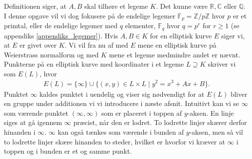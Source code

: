Definitionen siger, at $A, B$ skal tilhøre et legeme $K$. Det kunne være $\mathbb{R}, \mathbb{C}$ eller $\mathbb{Q}$. I denne opgave vil vi dog fokusere på de endelige legemer $\mathbb{F}_p = \mathbb{Z}/p\mathbb{Z}$ hvor $p$ er et primtal, eller de endelige legemer med $q$ elementer, $\mathbb{F}_q$ hvor $q = p^r$ for $r \geq 1$ (se appendiks \ref{appendiks_legemer}). Hvis $A, B \in K$ for en elliptisk kurve $E$ siger vi, at $E$ er givet over $K$. Vi vil fra nu af med $E$ mene en elliptisk kurve på Weierstrass normalform og med $K$ mene et legeme medmindre andet er nævnt. Punkterne på en elliptisk kurve med koordinater i et legeme $L \supseteq K$ skriver vi som $E(L)$, hvor 
\begin{align}
\label{elliptic_curve_points}
	E(L) = \{ \infty \} \cup \{ (x, y) \in L \times L \mid y^2 = x^3 + Ax + B \}.
\end{align}
Punktet $\infty$ kaldes punktet i uendelig og viser sig nødvendigt for at $E(L)$ bliver en gruppe under additionen vi vi introducere i næste afsnit. Intuitivt kan vi se $\infty$ som værende punktet $(\infty, \infty)$ som er placeret i toppen af $y$-aksen. En linje siges at gå igennem $\infty$ præcist, når den er lodret. To lodrette linjer skærer derfor hinanden i $\infty$. $\infty$ kan også tænkes som værende i bunden af $y$-aksen, men så vil to lodrette linjer skære hinanden to steder, hvilket er hvorfor vi kræver at $\infty$ i toppen og i bunden er et og samme punkt.


